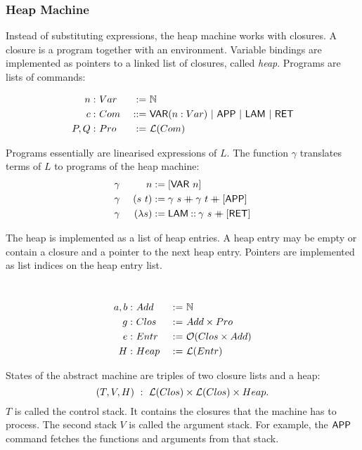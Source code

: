 \subsubsection{Heap Machine}
\label{sec:heap-def}
%

Instead of substituting expressions, the heap machine works with closures.  A closure is a program together with an environment.  Variable bindings
are implemented as pointers to a linked list of closures, called \textit{heap}.  Programs are lists of commands:
\begin{definition}[Program][Pro]
  \label{def:Com}
  \begin{alignat*}{2}
    n:   &~Var  &~:=~& \mathbb{N} \\
    c:   &~Com  &~::=~& \mathsf{VAR}(n:Var) ~|~ \mathsf{APP} ~|~ \mathsf{LAM} ~|~ \mathsf{RET} \\
    P,Q: &~Pro  &~:=~& \mathcal{L}(Com)
  \end{alignat*}
\end{definition}

Programs essentially are linearised expressions of $L$.  The function $\gamma$ translates terms of $L$ to programs of the heap machine:
\begin{alignat*}{2}
  &\gamma&~n           &:= [\mathsf{VAR}~n] \\
  &\gamma&~(s~t)       &:= \gamma~s \mathbin{+\mkern-10mu+} \gamma~t \mathbin{+\mkern-10mu+} [\mathsf{APP}] \\
  &\gamma&~(\lambda s) &:= \mathsf{LAM} \mathbin{::} \gamma~s \mathbin{+\mkern-10mu+} [\mathsf{RET}]
\end{alignat*}

The heap is implemented as a list of heap entries.  A heap entry may be empty or contain a closure and a pointer to the next heap entry.  Pointers are
implemented as list indices on the heap entry list.
\begin{definition}
  \label{def:Heap}
  ~
  \begin{alignat*}{2}
    a,b: &~Add  &~:=~& \mathbb{N} \\
    g:   &~Clos &~:=~& Add \times Pro \\
    e:   &~Entr &~:=~& \mathcal{O}(Clos \times Add) \\
    H:   &~Heap &~:=~& \mathcal{L}(Entr)
  \end{alignat*}
\end{definition}

States of the abstract machine are triples of two closure lists and a heap:
\[
  (T, V, H) ~:~ \mathcal{L}(Clos) \times \mathcal{L}(Clos) \times Heap.
\]
$T$ is called the control stack.  It contains the closures that the machine has to process.  The second stack $V$ is called the argument stack.  For
example, the $\mathsf{APP}$ command fetches the functions and arguments from that stack.


